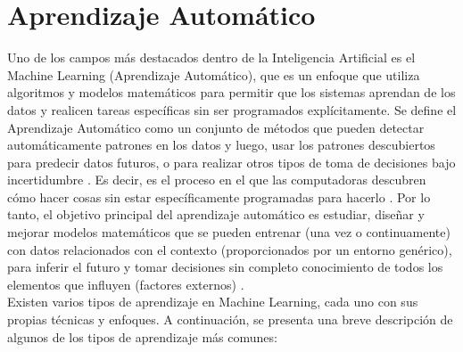 \section{Aprendizaje Automático}
Uno de los campos más destacados dentro de la Inteligencia Artificial es el Machine Learning (Aprendizaje Automático), que es un enfoque que utiliza algoritmos y modelos matemáticos para permitir que los sistemas aprendan de los datos y realicen tareas específicas sin ser programados explícitamente.
Se define el Aprendizaje Automático como un conjunto de métodos que pueden detectar automáticamente patrones en los datos y luego, usar los patrones descubiertos para predecir datos futuros, o para realizar otros tipos de toma de decisiones bajo incertidumbre \citep{murphy2012machine}. Es decir, es el proceso en el que las computadoras descubren cómo hacer cosas sin estar específicamente programadas para hacerlo \citep{Praba2021}. Por lo tanto, el objetivo principal del aprendizaje automático es estudiar, diseñar y mejorar modelos matemáticos que se pueden entrenar (una vez o continuamente) con datos relacionados con el contexto (proporcionados por un entorno genérico), para inferir el futuro y tomar decisiones sin completo conocimiento de todos los elementos que influyen (factores externos) \citep{bonaccorso2017machine}. \\
Existen varios tipos de aprendizaje en Machine Learning, cada uno con sus propias técnicas y enfoques. A continuación, se presenta una breve descripción de algunos de los tipos de aprendizaje más comunes:
